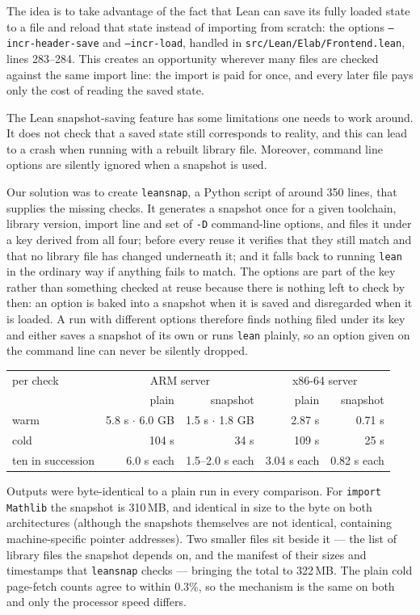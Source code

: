 \documentclass{article}
\newcommand{\Lean}{Lean\xspace}      %
\newcommand{\lean}{\texttt{lean}\xspace}      %
\begin{document}
The idea is to take advantage of the fact that \Lean can save its fully loaded state to a file and reload that state instead of importing from scratch: the options \texttt{--incr-header-save} and \texttt{--incr-load}, handled in \texttt{src/Lean/Elab/Frontend.lean}, lines 283--284. This creates an opportunity wherever many files are checked against the same import line: the import is paid for once, and every later file pays only the cost of reading the saved state.

The \Lean snapshot-saving feature has some limitations one needs to work around. It does not check that a saved state still corresponds to reality, and this can lead to a crash when running with a rebuilt library file. Moreover, command line options are silently ignored when a snapshot is used.

Our solution was to create \texttt{leansnap}, a Python script of around 350 lines,
that supplies the missing checks. It generates a snapshot once for a given toolchain, library version, import line and set of \texttt{-D} command-line options, and files it under a key derived from all four; before every reuse it verifies that they still match and that no library file has changed underneath it; and it falls back to running \lean in the ordinary way if anything fails to match. The options are part of the key rather than something checked at reuse because there is nothing left to check by then: an option is baked into a snapshot when it is saved and disregarded when it is loaded. A run with different options therefore finds nothing filed under its key and either saves a snapshot of its own or runs \lean plainly, so an option given on the command line can never be silently dropped.

\begin{center}\small
\begin{tabular}{lrrrr}
\toprule
per check & \multicolumn{2}{c}{ARM server} & \multicolumn{2}{c}{x86-64 server} \\
 & plain & snapshot & plain & snapshot \\
\midrule
warm & 5.8 s $\cdot$ 6.0 GB & 1.5 s $\cdot$ 1.8 GB & 2.87 s & 0.71 s \\
cold & 104 s & 34 s & 109 s & 25 s \\
ten in succession & 6.0 s each & 1.5--2.0 s each & 3.04 s each & 0.82 s each \\
\bottomrule
\end{tabular}
\end{center}

Outputs were byte-identical to a plain run in every comparison. For \texttt{import Mathlib} the snapshot is 310\,MB, and identical in size to the byte on both architectures (although the snapshots themselves are not identical, containing machine-specific pointer addresses). Two smaller files sit beside it --- the list of library files the snapshot depends on, and the manifest of their sizes and timestamps that \texttt{leansnap} checks --- bringing the total to 322\,MB. The plain cold page-fetch counts agree to within 0.3\%, so the mechanism is the same on both and only the processor speed differs.
\end{document}
